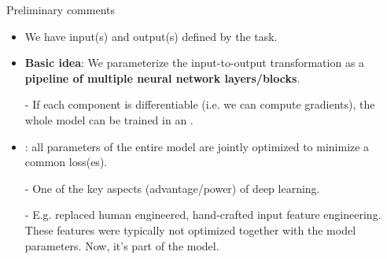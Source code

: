 \begin{frame}{Preliminary comments}
\begin{itemize}
\item We have input(s) and output(s) defined by the task.
\item\textbf{Basic idea}:  We parameterize the input-to-output transformation
as a \textbf{pipeline of multiple neural network layers/blocks}.
\item[-] If each component is differentiable (i.e. we can compute gradients), the whole model can be trained in an .
\item {}: all parameters of the entire model are jointly optimized to minimize a common loss(es).
\item[-] One of the key aspects (advantage/power) of deep learning.
\item[-] E.g. replaced human engineered, hand-crafted input feature engineering. These features were typically not optimized together with the model parameters. Now, it's part of the model.
\end{itemize}
\end{frame}

